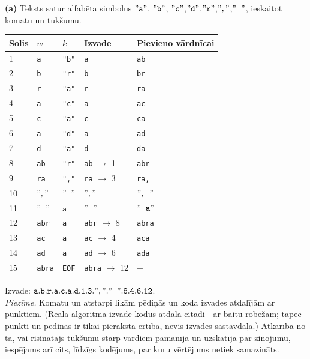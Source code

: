 \documentclass[11pt]{article}
\begin{document}
\noindent
{\bf (a)} Teksts satur alfabēta simbolus $\mathtt{"a"}$, $\mathtt{"b"}$,
$\mathtt{"c"}$,$\mathtt{"d"}$,$\mathtt{"r"}$,$\mathtt{","}$,$\mathtt{"\;\;"}$, ieskaitot 
komatu un tukšumu. 

\begin{center}
\begin{tabular}{ |l|l|l|l|l| } \hline
Solis & $w$ & $k$ & Izvade & Pievieno vārdnīcai \\ \hline
1 & {\tt a} & {\tt "b"} & {\tt a} & {\tt ab} \\
2 & {\tt b} & {\tt "r"} & {\tt b} & {\tt br} \\ 
3 & {\tt r} & {\tt "a"} & {\tt r} & {\tt ra} \\ 
4 & {\tt a} & {\tt "c"} & {\tt a} & {\tt ac} \\ 
5 & {\tt c} & {\tt "a"} & {\tt c} & {\tt ca} \\ 
6 & {\tt a} & {\tt "d"} & {\tt a} & {\tt ad} \\ 
7 & {\tt d} & {\tt "a"} & {\tt d} & {\tt da} \\ 
8 & {\tt ab} & {\tt "r"} & {\tt ab} $\rightarrow$ 1 & {\tt abr} \\
9 & {\tt ra} & {\tt ","} & {\tt ra} $\rightarrow$ 3 & {\tt ra,} \\ 
10 & $\mathtt{","}$ & $\mathtt{"\;\;"}$ & $\mathtt{","}$ & $\mathtt{",\;\;"}$ \\
11 & $\mathtt{"\;\;"}$ & $\mathtt{a}$ & $\mathtt{"\;\;"}$ & $\mathtt{"\;\;a"}$ \\
12 & {\tt abr} & {\tt a} & {\tt abr} $\rightarrow$ 8 & {\tt abra}\\
13 & {\tt ac} & {\tt a} & {\tt ac} $\rightarrow$ 4 & {\tt aca}\\
14 & {\tt ad} & {\tt a} & {\tt ad} $\rightarrow$ 6 & {\tt ada}\\
15 & {\tt abra} & {\tt EOF} & {\tt abra} $\rightarrow$ 12 & $-$\\ \hline
\end{tabular}
\end{center}

Izvade: $\mathtt{a.b.r.a.c.a.d.1.3.","."\;\;".8.4.6.12}$.\\
{\em Piezīme.} Komatu un atstarpi likām pēdiņās un koda izvades atdalījām ar punktiem. 
(Reālā algoritma izvadē kodus atdala citādi - ar baitu robežām; tāpēc punkti un pēdiņas 
ir tikai pieraksta ērtība, nevis izvades sastāvdaļa.)
Atkarībā no tā, vai risinātājs tukšumu starp vārdiem pamanīja un uzskatīja par ziņojumu, 
iespējams arī cits, līdzīgs kodējums, par kuru vērtējums netiek samazināts.
\end{document}
